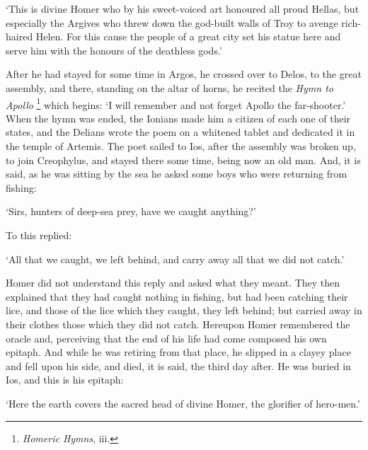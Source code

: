‘This is divine Homer who by his sweet-voiced art honoured all proud
Hellas, but especially the Argives who threw down the god-built walls of Troy
to avenge rich-haired Helen. For this cause the people of a great city set his
statue here and serve him with the honours of the deathless gods.’

After he had stayed for some time in Argos, he crossed over to Delos, to the
great assembly, and there, standing on the altar of horns, he recited the
\emph{Hymn to Apollo} \footnote{\emph{Homeric
Hymns}, iii.} which begins: ‘I will
remember and not forget Apollo the far-shooter.’ When the hymn was ended,
the Ionians made him a citizen of each one of their states, and the Delians
wrote the poem on a whitened tablet and dedicated it in the temple of Artemis.
The poet sailed to Ios, after the assembly was broken up, to join Creophylus,
and stayed there some time, being now an old man. And, it is said, as he was
sitting by the sea he asked some boys who were returning from fishing:

‘Sirs, hunters of deep-sea prey, have we caught anything?’

To this replied:

‘All that we caught, we left behind, and carry away all that we did not
catch.’

Homer did not understand this reply and asked what they meant. They then
explained that they had caught nothing in fishing, but had been catching their
lice, and those of the lice which they caught, they left behind; but carried
away in their clothes those which they did not catch. Hereupon Homer remembered
the oracle and, perceiving that the end of his life had come composed his own
epitaph. And while he was retiring from that place, he slipped in a clayey
place and fell upon his side, and died, it is said, the third day after. He was
buried in Ios, and this is his epitaph:

‘Here the earth covers the sacred head of divine Homer, the glorifier of
hero-men.’
